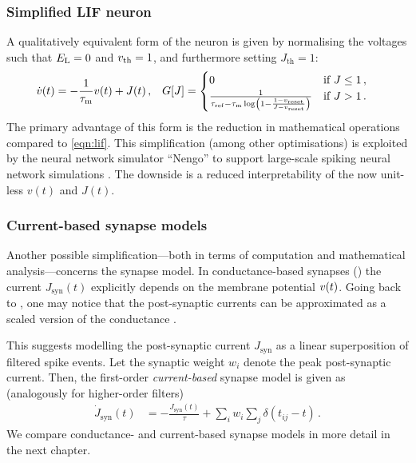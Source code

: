 \subsubsection{Simplified LIF neuron}
A qualitatively equivalent form of the \LIF neuron is given by normalising the voltages such that $E_\mathrm{L} = 0$ and $v_\mathrm{th} = 1$, and furthermore setting $J_\mathrm{th} = 1$:
\begin{align}
	\dot v(t) &= -\frac{1}{{\tau_\mathrm{m}}} v(t) + J(t) \,, &
	G[J] &= \begin{cases}
		0 & \text{if } J \leq 1 \,, \\
		\frac{1}{{\tau_\mathrm{ref}} - {\tau_\mathrm{m}} \log\left(1 - \frac{1 - v_\mathrm{reset}}{J-v_\mathrm{reset}}\right)} & \text{if } J > 1 \,.
	\end{cases}
	\label{eqn:lif_simplified}
\end{align}
The primary advantage of this form is the reduction in mathematical operations compared to \cref{eqn:lif}.
This simplification (among other optimisations) is exploited by the neural network simulator \enquote{Nengo} to support large-scale spiking neural network simulations \citep{bekolay2014nengo}.
The downside is a reduced interpretability of the now unit-less $v(t)$ and $J(t)$.

\subsubsection{Current-based synapse models}
Another possible simplification---both in terms of computation and mathematical analysis---concerns the synapse model.
In conductance-based synapses () the current $J_\mathrm{syn}(t)$ explicitly depends on the membrane potential ${v}(t)$.
Going back to , one may notice that the post-synaptic currents can be approximated as a scaled version of the conductance \citep[cf.][]{roth2009modeling}.

This suggests modelling the post-synaptic current $J_\mathrm{syn}$ as a linear superposition of filtered spike events.
Let the synaptic weight $w_i$ denote the peak post-synaptic current.
Then, the first-order \emph{current-based} synapse model is given as (analogously for higher-order filters)
\begin{align}
	\dot J_\mathrm{syn}(t) &= -\frac{J_\mathrm{syn}(t)}{\tau} + \sum\nolimits_{i}  w_i \sum\nolimits_{j} \delta(t_{ij} - t) \,.
	\label{eqn:low_pass_first_order_current}
\end{align}
We compare conductance- and current-based synapse models in more detail in the next chapter.

